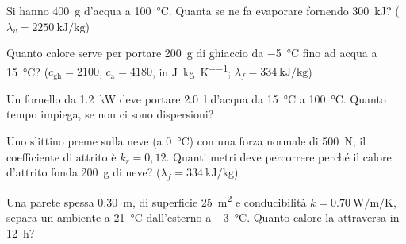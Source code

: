 \begin{esercizio}
Si hanno \SI{400}{\gram} d'acqua a \SI{100}{\celsius}. Quanta se ne fa evaporare fornendo \SI{300}{\kilo\joule}? ($\lambda_v = \SI{2250}{\kilo\joule\per\kilogram}$)\\
\end{esercizio}

\begin{esercizio}
Quanto calore serve per portare \SI{200}{\gram} di ghiaccio da \SI{-5}{\celsius} fino ad acqua a \SI{15}{\celsius}? ($c_{\text{gh}} = 2100$, $c_{\text{a}} = 4180$, in \si{\joule\per\kilogram\per\kelvin}; $\lambda_f = \SI{334}{\kilo\joule\per\kilogram}$)\\
\end{esercizio}

\begin{esercizio}
Un fornello da \SI{1,2}{\kilo\watt} deve portare \SI{2,0}{\litre} d'acqua da \SI{15}{\celsius} a \SI{100}{\celsius}. Quanto tempo impiega, se non ci sono dispersioni?\\
\end{esercizio}

\begin{esercizio}
Uno slittino preme sulla neve (a \SI{0}{\celsius}) con una forza normale di \SI{500}{\newton}; il coefficiente di attrito è $k_r = 0{,}12$. Quanti metri deve percorrere perché il calore d'attrito fonda \SI{200}{\gram} di neve? ($\lambda_f = \SI{334}{\kilo\joule\per\kilogram}$)\\
\end{esercizio}

\begin{esercizio}
Una parete spessa \SI{0,30}{\metre}, di superficie \SI{25}{\metre\squared} e conducibilità $k = \SI{0,70}{\watt\per\metre\per\kelvin}$, separa un ambiente a \SI{21}{\celsius} dall'esterno a \SI{-3}{\celsius}. Quanto calore la attraversa in \SI{12}{\hour}?\\
\end{esercizio}

